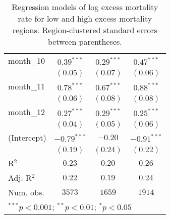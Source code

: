 \begin{table}
\begin{center}
\begin{small}
\begin{tabular}{l c c c}
month\_10      & $0.39^{***}$  & $0.29^{***}$  & $0.47^{***}$  \\
               & $(0.05)$      & $(0.07)$      & $(0.06)$      \\
month\_11      & $0.78^{***}$  & $0.67^{***}$  & $0.88^{***}$  \\
               & $(0.06)$      & $(0.08)$      & $(0.08)$      \\
month\_12      & $0.27^{***}$  & $0.29^{***}$  & $0.25^{***}$  \\
               & $(0.04)$      & $(0.05)$      & $(0.06)$      \\
(Intercept)    & $-0.79^{***}$ & $-0.20$       & $-0.91^{***}$ \\
               & $(0.19)$      & $(0.24)$      & $(0.22)$      \\
\hline
R$^2$          & $0.23$        & $0.20$        & $0.26$        \\
Adj. R$^2$     & $0.22$        & $0.19$        & $0.24$        \\
Num. obs.      & $3573$        & $1659$        & $1914$        \\
\hline
\multicolumn{4}{l}{\tiny{$^{***}p<0.001$; $^{**}p<0.01$; $^{*}p<0.05$}}
\end{tabular}
\end{small}
\caption{Regression models of log excess mortality rate for low and high excess mortality regions. Region-clustered standard errors between parentheses.}
\label{tab:hilomodels}
\end{center}
\end{table}
